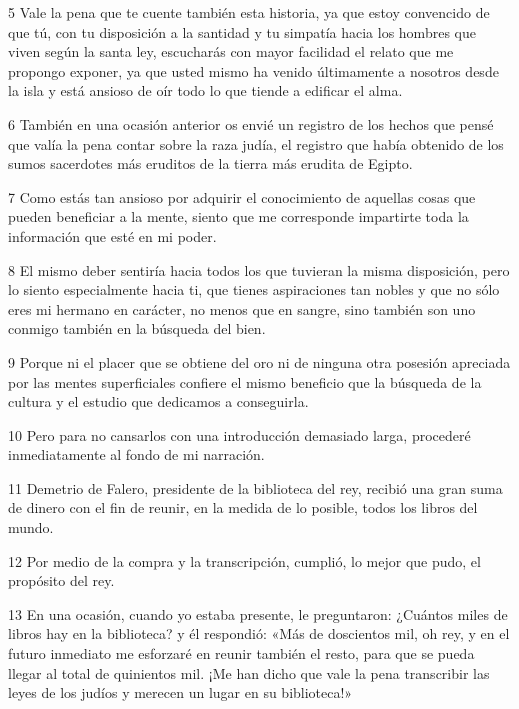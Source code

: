 \par 5 Vale la pena que te cuente también esta historia, ya que estoy convencido de que tú, con tu disposición a la santidad y tu simpatía hacia los hombres que viven según la santa ley, escucharás con mayor facilidad el relato que me propongo exponer, ya que usted mismo ha venido últimamente a nosotros desde la isla y está ansioso de oír todo lo que tiende a edificar el alma.

\par 6 También en una ocasión anterior os envié un registro de los hechos que pensé que valía la pena contar sobre la raza judía, el registro que había obtenido de los sumos sacerdotes más eruditos de la tierra más erudita de Egipto.

\par 7 Como estás tan ansioso por adquirir el conocimiento de aquellas cosas que pueden beneficiar a la mente, siento que me corresponde impartirte toda la información que esté en mi poder.

\par 8 El mismo deber sentiría hacia todos los que tuvieran la misma disposición, pero lo siento especialmente hacia ti, que tienes aspiraciones tan nobles y que no sólo eres mi hermano en carácter, no menos que en sangre, sino también son uno conmigo también en la búsqueda del bien.

\par 9 Porque ni el placer que se obtiene del oro ni de ninguna otra posesión apreciada por las mentes superficiales confiere el mismo beneficio que la búsqueda de la cultura y el estudio que dedicamos a conseguirla.

\par 10 Pero para no cansarlos con una introducción demasiado larga, procederé inmediatamente al fondo de mi narración.

\par 11 Demetrio de Falero, presidente de la biblioteca del rey, recibió una gran suma de dinero con el fin de reunir, en la medida de lo posible, todos los libros del mundo.

\par 12 Por medio de la compra y la transcripción, cumplió, lo mejor que pudo, el propósito del rey.

\par 13 En una ocasión, cuando yo estaba presente, le preguntaron: ¿Cuántos miles de libros hay en la biblioteca? y él respondió: «Más de doscientos mil, oh rey, y en el futuro inmediato me esforzaré en reunir también el resto, para que se pueda llegar al total de quinientos mil. ¡Me han dicho que vale la pena transcribir las leyes de los judíos y merecen un lugar en su biblioteca!»

